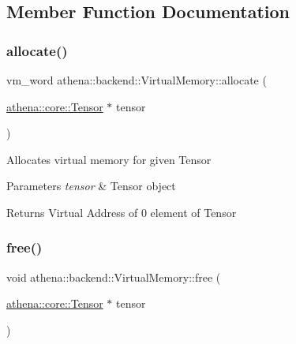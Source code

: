 \subsection{Member Function Documentation}
\mbox{\label{classathena_1_1backend_1_1_virtual_memory_a22be58a8e0cb574a7d46d4095cb64ac5}} 
\subsubsection{\texorpdfstring{allocate()}{allocate()}}
{\footnotesize\ttfamily vm\+\_\+word athena\+::backend\+::\+Virtual\+Memory\+::allocate (\begin{DoxyParamCaption}\item[{\mbox{\hyperlink{classathena_1_1core_1_1_tensor}{athena\+::core\+::\+Tensor}} $\ast$}]{tensor }\end{DoxyParamCaption})}

Allocates virtual memory for given Tensor 
\begin{DoxyParams}{Parameters}
{\em tensor} & Tensor object \\
\hline
\end{DoxyParams}
\begin{DoxyReturn}{Returns}
Virtual Address of 0 element of Tensor 
\end{DoxyReturn}
\mbox{\label{classathena_1_1backend_1_1_virtual_memory_a73815358c436f8f6dd73d49d4d5d189d}} 
\subsubsection{\texorpdfstring{free()}{free()}\hspace{0.1cm}{\footnotesize\ttfamily [1/2]}}
{\footnotesize\ttfamily void athena\+::backend\+::\+Virtual\+Memory\+::free (\begin{DoxyParamCaption}\item[{\mbox{\hyperlink{classathena_1_1core_1_1_tensor}{athena\+::core\+::\+Tensor}} $\ast$}]{tensor }\end{DoxyParamCaption})}


